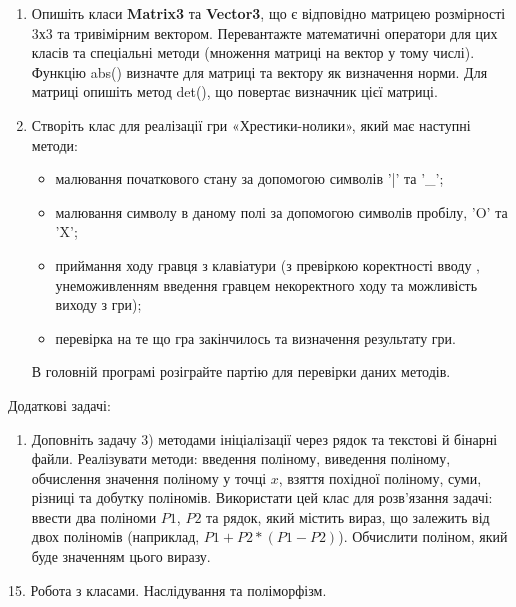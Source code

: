 \documentclass[]{article}
\makeatletter
\newcommand{\xslalph}[1]{\expandafter\@xslalph\csname c@#1\endcsname}
\newcommand{\@xslalph}[1]{%
    \ifcase#1\or а\or б\or в\or г\or д\or e\or є\or ж\or з\or i%
    \or й\or к\or л\or м\or н\or о\or п\or р\or с\or т%
    \or у\or ф\or х\or ц\or ч\or ш\or ю\or я\or аа\or бб\or вв%
    \else\@ctrerr\fi%
}
\makeatother
\begin{document}
\begin{enumerate}
\begin{enumerate}[label=\xslalph*)]
\begin{enumerate}
\begin{enumerate}[label=\xslalph*)]
\begin{enumerate}
\item
  Опишіть класи \textbf{Matrix3} та \textbf{Vector3}, що є відповідно матрицею розмірності
  3х3 та тривімірним вектором. Перевантажте математичні оператори для
  цих класів та спеціальні методи (множення матриці на вектор у тому
  числі). Функцію abs() визначте для матриці та вектору як визначення
  норми. Для матриці опишіть метод det(), що повертає визначник цієї
  матриці.

\item
Створіть клас для реалізації гри «Хрестики-нолики», який має наступні методи: 
\begin{itemize}
\item
малювання початкового стану за допомогою символів '|' та '\_'; 
\item
малювання символу в даному полі за допомогою символів пробілу, 'O' та 'X'; 
\item
приймання ходу гравця з клавіатури (з превіркою коректності вводу , 
унеможивленням введення гравцем некоректного ходу та можливість виходу з гри);
\item
перевірка на те що гра закінчилось та визначення результату гри. 
\end{itemize}
В головній програмі розіграйте партію для перевірки даних методів.

\end{enumerate}

Додаткові задачі:

\begin{enumerate}
\def\labelenumi{\arabic{enumi})}
\setcounter{enumi}{14}
\item
Доповніть задачу 3) методами ініціалізації через рядок та текстові й бінарні файли.
Реалізувати методи: введення поліному, виведення поліному, обчислення
значення поліному у точці $x$, взяття похідної поліному, суми, різниці та
добутку поліномів. Використати цей клас для розв'язання задачі: ввести два
поліноми $P1$, $P2$ та рядок, який містить вираз, що залежить від двох
поліномів (наприклад, $P1 + P2*(P1- P2) $). Обчислити поліном, який буде значенням цього виразу.

\end{enumerate}


15. Робота з класами. Наслідування та поліморфізм.


\end{enumerate}
\end{enumerate}
\end{enumerate}
\end{enumerate}
\end{document}
